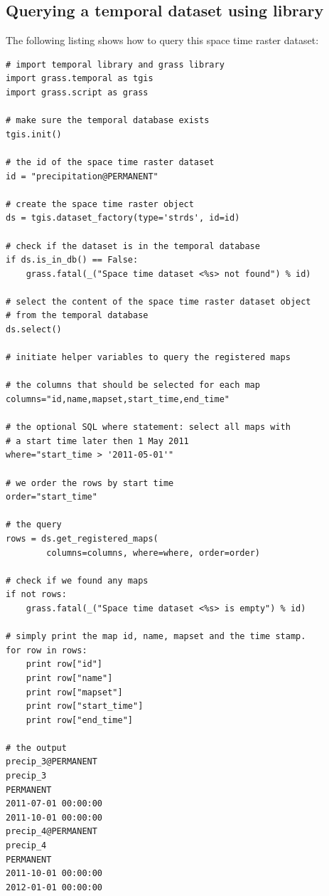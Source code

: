 \documentclass[a4paper,12pt,oneside]{book}
\begin{document}
\subsection*{Querying a temporal dataset using library}
The following listing shows how to query this space time raster dataset:
\begin{small}
\begin{lstlisting}[style=python]
# import temporal library and grass library
import grass.temporal as tgis
import grass.script as grass

# make sure the temporal database exists
tgis.init()

# the id of the space time raster dataset
id = "precipitation@PERMANENT"

# create the space time raster object
ds = tgis.dataset_factory(type='strds', id=id)

# check if the dataset is in the temporal database
if ds.is_in_db() == False:
    grass.fatal(_("Space time dataset <%s> not found") % id)

# select the content of the space time raster dataset object
# from the temporal database
ds.select()

# initiate helper variables to query the registered maps

# the columns that should be selected for each map
columns="id,name,mapset,start_time,end_time"

# the optional SQL where statement: select all maps with
# a start time later then 1 May 2011
where="start_time > '2011-05-01'"

# we order the rows by start time
order="start_time"

# the query
rows = ds.get_registered_maps(
        columns=columns, where=where, order=order)

# check if we found any maps
if not rows:
    grass.fatal(_("Space time dataset <%s> is empty") % id)

# simply print the map id, name, mapset and the time stamp.
for row in rows:
    print row["id"]
    print row["name"]
    print row["mapset"]
    print row["start_time"]
    print row["end_time"]

# the output
precip_3@PERMANENT
precip_3
PERMANENT
2011-07-01 00:00:00
2011-10-01 00:00:00
precip_4@PERMANENT
precip_4
PERMANENT
2011-10-01 00:00:00
2012-01-01 00:00:00

\end{lstlisting}
\end{small}
\end{document}

